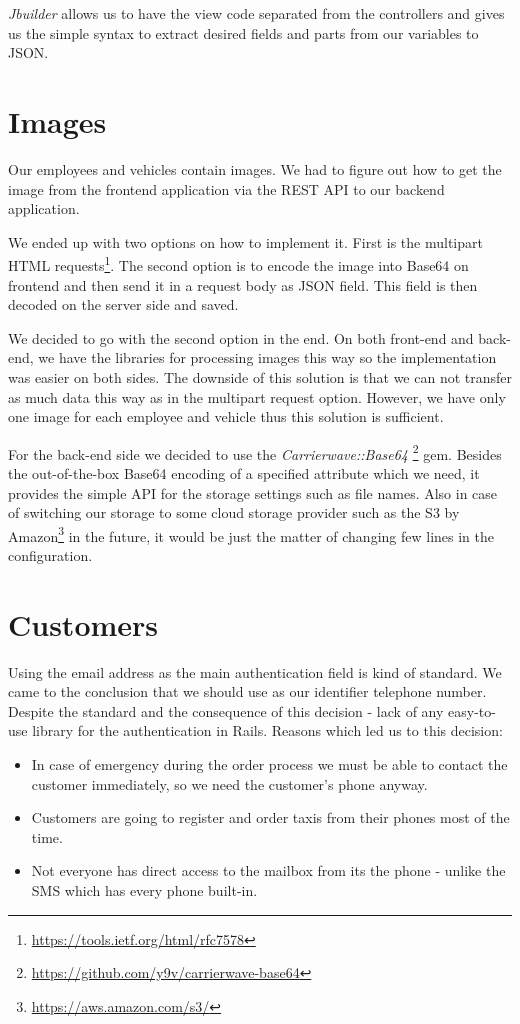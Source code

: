 	\textit{Jbuilder} allows us to have the view code separated from the controllers and gives us the simple syntax to extract desired fields and parts from our variables to JSON.
\section{Images}
	Our employees and vehicles contain images. We had to figure out how to get the image from the frontend application via the REST API to our backend application. 
	
	We ended up with two options on how to implement it. First is the multipart HTML requests\footnote{\url{https://tools.ietf.org/html/rfc7578}}. The second option is to encode the image into Base64 on frontend and then send it in a request body as JSON field. This field is then decoded on the server side and saved.
	
	We decided to go with the second option in the end. On both front-end and back-end, we have the libraries for processing images this way so the implementation was easier on both sides. The downside of this solution is that we can not transfer as much data this way as in the multipart request option. However, we have only one image for each employee and vehicle thus this solution is sufficient.
	
	For the back-end side we decided to use the \textit{Carrierwave::Base64} \footnote{\url{https://github.com/y9v/carrierwave-base64}} gem. Besides the out-of-the-box Base64 encoding of a specified attribute which we need, it provides the simple API for the storage settings such as file names. Also in case of switching our storage to some cloud storage provider such as the S3 by Amazon\footnote{\url{https://aws.amazon.com/s3/}} in the future, it would be just the matter of changing few lines in the configuration. 

\section{Customers}
Using the email address as the main authentication field is kind of standard. We came to the conclusion that we should use as our identifier telephone number. Despite the standard and the consequence of this decision - lack of any easy-to-use library for the authentication in Rails. Reasons which led us to this decision:
\begin{itemize}
	\item In case of emergency during the order process we must be able to contact the customer immediately, so we need the customer's phone anyway.
	\item Customers are going to register and order taxis from their phones most of the time. 
	\item Not everyone has direct access to the mailbox from its the phone - unlike the SMS which has every phone built-in. 
\end{itemize}
